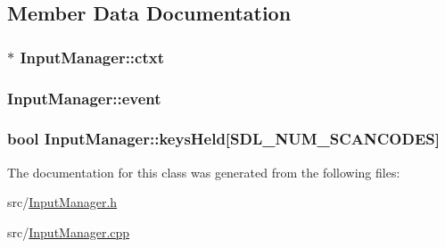 \subsection{Member Data Documentation}
\hypertarget{class_input_manager_a3891b3d4d2ac13dfda2cccc96531ce76}{
\subsubsection[{ctxt}]{$\ast$ Input\-Manager\-::ctxt}}\label{class_input_manager_a3891b3d4d2ac13dfda2cccc96531ce76}
\hypertarget{class_input_manager_af4889753f2148b02fe0fba6300d283d2}{
\subsubsection[{event}]{ Input\-Manager\-::event}}\label{class_input_manager_af4889753f2148b02fe0fba6300d283d2}
\hypertarget{class_input_manager_ac25bf7f3db8d303695827bbf959ebdcf}{
\subsubsection[{keys\-Held}]{\setlength{\rightskip}{0pt plus 5cm}bool Input\-Manager\-::keys\-Held\mbox{[}{\bf S\-D\-L\-\_\-\-N\-U\-M\-\_\-\-S\-C\-A\-N\-C\-O\-D\-E\-S}\mbox{]}}}\label{class_input_manager_ac25bf7f3db8d303695827bbf959ebdcf}


The documentation for this class was generated from the following files\-:\begin{DoxyCompactItemize}
\item 
src/\hyperlink{_input_manager_8h}{Input\-Manager.\-h}\item 
src/\hyperlink{_input_manager_8cpp}{Input\-Manager.\-cpp}\end{DoxyCompactItemize}
